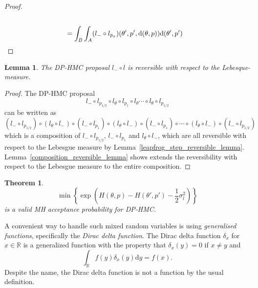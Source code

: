 \documentclass[english,twoside,openright]{HYgraduMLDS}
\newtheorem{lemma}{Lemma}
\newtheorem{theorem}{Theorem}
\newcommand{\R}{\mathbb{R}}
\newcommand{\dx}{\mathrm{d}}
\newcommand{\caln}{{\mathcal{N}}}
\begin{document}
\begin{proof}
\begin{align*}
    \\&= \int_{B}\int_{A}(l_{-}\circ l_{p_{x}})(\theta', p', \dx(\theta, p))\dx(\theta', p')
    \qedhere
  \end{align*}
\end{proof}

\begin{lemma}\label{leapfrog_reversibility_lemma}
	The DP-HMC proposal \(l_{-} \circ l\) is reversible with respect
  to the Lebesque-measure.
\end{lemma}
\begin{proof}
  The DP-HMC proposal
  \[
    l_{-}\circ l_{p_{1/2}}\circ l_{\theta}\circ l_{p_{1}}\circ l_{\theta}
    \dotsb \circ l_{\theta}\circ l_{p_{1/2}}
  \]
  can be written as
  \[
    (l_{-}\circ l_{p_{1/2}})\circ (l_{\theta} \circ l_{-})\circ (l_{-}\circ l_{p_{1}})
    \circ (l_{\theta} \circ l_{-}) \circ (l_{-} \circ l_{p_{1}})\circ
    \dotsb \circ (l_{\theta}\circ l_{-})\circ (l_{-}\circ l_{p_{1/2}})
  \]
  which is a composition of \(l_{-}\circ l_{p_{1/2}}\), \(l_{-}\circ l_{p_{1}}\)
  and \(l_{\theta}\circ l_{-}\), which are all reversible with respect to the
  Lebesgue measure by Lemma~\ref{leapfrog_step_reversible_lemma}.
  Lemma~\ref{composition_reversible_lemma} shows extends the reversibility
  with respect to the Lebesgue measure to the entire composition.
\end{proof}

\begin{theorem}
  \[
    \min\left\{\exp\left(H(\theta, p)
        - H(\theta', p') - \frac{1}{2}\sigma_{l}^{2}\right)\right\}
  \]
  is a valid MH acceptance probability for DP-HMC.
\end{theorem}

A convenient way to handle such mixed random variables
is using \emph{generalised functions}, specifically the
\emph{Dirac delta function}. The Dirac delta function \(\delta_{x}\) for
\(x\in \R\) is a
generalized function with the property that \(\delta_{x}(y) = 0\) if
\(x \neq y\) and
\[
  \int_{\R} f(y)\delta_{x}(y) \dx y = f(x).
\]
Despite the name, the Dirac delta function is not a function by the usual
definition.
\end{document}
